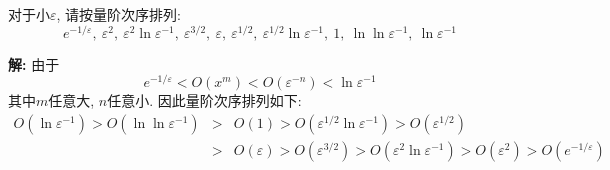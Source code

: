 \begin{problem}[习题1.3]
对于小$\varepsilon$, 请按量阶次序排列:
\[
e^{-1/\varepsilon}, ~ \varepsilon^2, ~ \varepsilon^2\ln\varepsilon^{-1}, ~ \varepsilon^{3/2}, ~ \varepsilon, ~ \varepsilon^{1/2},
~ \varepsilon^{1/2}\ln\varepsilon^{-1}, ~ 1, ~ \ln\ln\varepsilon^{-1}, ~\ln\varepsilon^{-1}
\]
\end{problem}

\begin{solution}
\textbf{解:} 由于
\[
e^{-1/\varepsilon} < O(x^m) < O(\varepsilon^{-n})< \ln\varepsilon^{-1}
\]
其中$m$任意大, $n$任意小. 因此量阶次序排列如下:
\begin{eqnarray}
O(\ln\varepsilon^{-1}) > O(\ln\ln\varepsilon^{-1})\!\!&>&\!\!O(1) > O(\varepsilon^{1/2}\ln\varepsilon^{-1}) > O(\varepsilon^{1/2})\nonumber\\
 \!\!&>&\!\! O(\varepsilon) > O(\varepsilon^{3/2}) > O(\varepsilon^2\ln\varepsilon^{-1}) > O(\varepsilon^2) > O(e^{-1/\varepsilon})\nonumber
\end{eqnarray}

\end{solution} 
